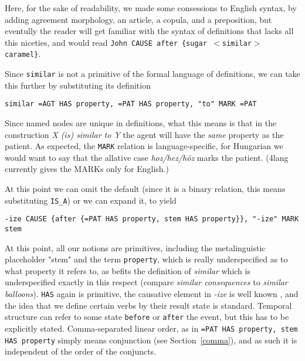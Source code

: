 \documentclass[11pt,bookmarks,bookmarksnumbered,naturalnames,plainpages=false,pdftex,colorlinks=true,urlcolor=blue,bookmarksdepth=subsection,plainpages=false]{paper}
\begin{document}
Here, for the sake of readability, we made some consessions to English syntax,
by adding agreement morphology, an article, a copula, and a preposition, but
eventully the reader will get familiar with the syntax of definitions that
lacks all this niceties, and would read {\tt John CAUSE after \{sugar $<$similar$>$
    caramel\}}. 


Since {\tt similar} is not a primitive of the formal language of definitions,
we can take this further by substituting its definition 

\begin{verbatim}
similar =AGT HAS property, =PAT HAS property, "to" MARK =PAT
\end{verbatim}

\noindent
Since named nodes are unique in definitions, what this means is that in the
construction {\it X (is) similar to Y} the agent will have the {\it same}
property as the patient. As expected, the {\tt MARK} relation is
language-specific, for Hungarian we would want to say that the allative case
{\it hoz/hez/h\"{o}z} marks the patient. (4lang currently gives the MARKs only
for English.) 

At this point we can omit the default (since it is a binary relation, this
means substituting {\tt IS\_A}) or we can expand it, to yield 

\begin{verbatim}
-ize CAUSE {after {=PAT HAS property, stem HAS property}}, "-ize" MARK stem
\end{verbatim}

\noindent At this point, all our notions are primitives, including the
metalinguistic placeholder "stem" and the term {\tt property}, which is really
underspecified as to what property it refers to, as befits the definition of
{\it similar} which is underspecified exactly in this respect (compare {\it
  similar consequences} to {\it similar balloons}). {\tt HAS} again is
primitive, the causative element in {\it -ize} is well known
\citep{Lieber:1992,Plag:1998}, and the idea that we define certain verbs by
their result state is standard. Temporal structure can refer to some state
{\tt before} or {\tt after} the event, but this has to be explicitly
stated. Comma-separated linear order, as in {\tt =PAT HAS property, stem HAS
  property} simply means conjunction (see Section~\ref{comma}), and as such 
it is independent of the order of the conjuncts. 
\end{document}
